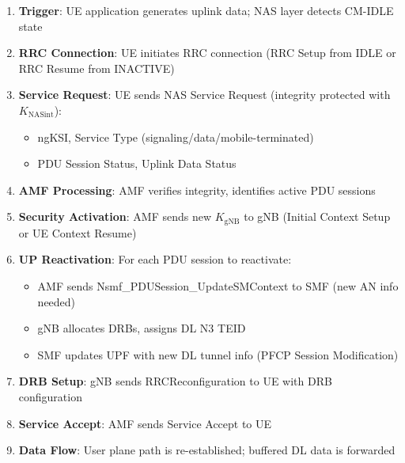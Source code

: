 \begin{enumerate}
\def\labelenumi{\arabic{enumi}.}
\tightlist
\item
  \textbf{Trigger}: UE application generates uplink data; NAS layer detects CM-IDLE state
\item
  \textbf{RRC Connection}: UE initiates RRC connection (RRC Setup from IDLE or RRC Resume from INACTIVE)
\item
  \textbf{Service Request}: UE sends NAS Service Request (integrity protected with \ensuremath{K_{\mathrm{NASint}}}):

  \begin{itemize}
  \tightlist
  \item
    ngKSI, Service Type (signaling/\allowbreak{}data/\allowbreak{}mobile-terminated)
  \item
    PDU Session Status, Uplink Data Status
  \end{itemize}
\item
  \textbf{AMF Processing}: AMF verifies integrity, identifies active PDU sessions
\item
  \textbf{Security Activation}: AMF sends new \ensuremath{K_{\mathrm{gNB}}} to gNB (Initial Context Setup or UE Context Resume)
\item
  \textbf{UP Reactivation}: For each PDU session to reactivate:

  \begin{itemize}
  \tightlist
  \item
    AMF sends Nsmf\_\allowbreak{}PDUSession\_\allowbreak{}UpdateSMContext to SMF (new AN info needed)
  \item
    gNB allocates DRBs, assigns DL N3 TEID
  \item
    SMF updates UPF with new DL tunnel info (PFCP Session Modification)
  \end{itemize}
\item
  \textbf{DRB Setup}: gNB sends RRCReconfiguration to UE with DRB configuration
\item
  \textbf{Service Accept}: AMF sends Service Accept to UE
\item
  \textbf{Data Flow}: User plane path is re-established; buffered DL data is forwarded
\end{enumerate}





